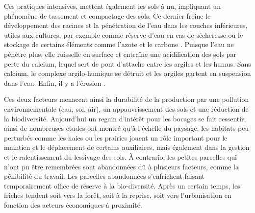 \documentclass[../thesis.tex]{subfiles}
\begin{document}
    \par Ces pratiques intensives, mettent également les sols à nu, impliquant un phénomène de tassement et compactage des sols. Ce dernier freine le développement des racines et la pénétration de l'eau dans les couches inférieures, utiles aux cultures, par exemple comme réserve d'eau en cas de sécheresse ou le stockage de certains éléments comme l'azote et le carbone \cite{dos2009crop, nemery2016carbon, kan2020responses}. Puisque l'eau ne pénètre plus, elle ruisselle en surface et \og entraîne une acidification des sols par perte du calcium, lequel sert de pont d'attache entre les argiles et les humus. Sans calcium, le complexe argilo-humique se détruit et les argiles partent en suspension dans l'eau. Enfin, il y a l'érosion \fg     
    {\cite{ANTHONY2012268, YOUSEFI201655, cossart2019erosion, hinimbio:tel-02305183, kolli2021estimation}.}
    
    
    \par Ces deux facteurs menacent ainsi la durabilité de la production par une pollution environnementale (eau, sol, air), un appauvrissement des sols et une réduction de la biodiversité. Aujourd'hui un regain d'intérêt pour les bocages se fait ressentir, ainsi de nombreuses études ont montré qu'à l'échelle du paysage, les habitats peu perturbés comme les haies ou les prairies jouent un rôle important pour le maintien et le déplacement de certains auxiliaires, mais également dans la gestion et le ralentissement du lessivage des sols. À contrario, les petites parcelles qui n'ont pu être remembrées sont abandonnées dû à plusieurs facteurs, comme la pénibilité du travail. Les parcelles abandonnées s'enfrichent \cite{pic:hal-03008309} faisant temporairement office de réserve à la bio-diversité. Après un certain temps, les friches tendent soit vers la forêt, soit à la reprise, soit vers l'urbanisation en fonction des acteurs économiques à proximité.
    
    
    
\end{document}
